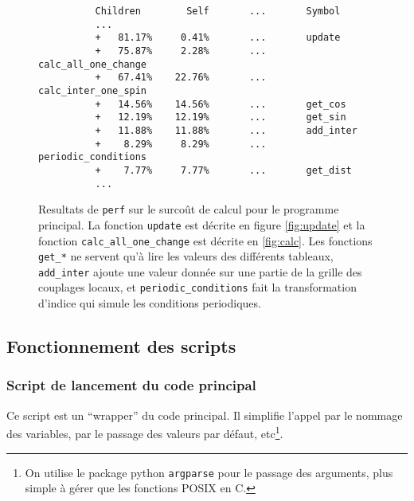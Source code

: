 \documentclass[a4paper, openany, 11pt]{article}
\begin{document}
\begin{figure}
    \begin{center}
        \begin{verbatim}
          Children        Self       ...       Symbol
          ...
          +   81.17%     0.41%       ...       update    
          +   75.87%     2.28%       ...       calc_all_one_change
          +   67.41%    22.76%       ...       calc_inter_one_spin
          +   14.56%    14.56%       ...       get_cos
          +   12.19%    12.19%       ...       get_sin
          +   11.88%    11.88%       ...       add_inter
          +    8.29%     8.29%       ...       periodic_conditions
          +    7.77%     7.77%       ...       get_dist                 
          ...
        \end{verbatim}
    \end{center}
    \caption{Resultats de \texttt{perf} sur le surcoût de calcul pour le programme principal. La
    fonction \texttt{update} est décrite en figure \ref{fig:update} et la fonction
    \texttt{calc\_all\_one\_change} est décrite en \ref{fig:calc}. Les fonctions \texttt{get\_*} ne
    servent qu'à lire les valeurs des différents tableaux, \texttt{add\_inter} ajoute une valeur
    donnée sur une partie de la grille des couplages locaux, et \texttt{periodic\_conditions} fait
    la transformation d'indice qui simule les conditions periodiques. }
    \label{fig:perfdata}
\end{figure}

\subsection{Fonctionnement des scripts} 

\subsubsection{Script de lancement du code principal}

Ce script est un ``wrapper'' du code principal. Il simplifie l'appel par le nommage des variables, 
par le passage des valeurs par défaut, etc\footnote{On utilise le package python \texttt{argparse}
pour le passage des arguments, plus simple à gérer que les fonctions POSIX en C.}.
\end{document}
